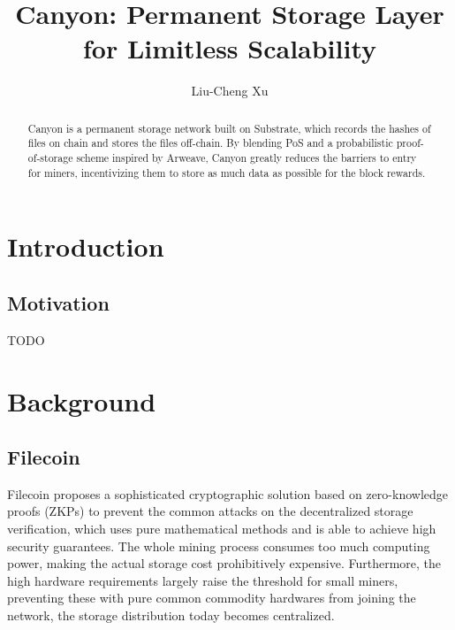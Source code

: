 \documentclass[]{article}
\title{Canyon: Permanent Storage Layer for Limitless Scalability}
\author{Liu-Cheng Xu}
\date{}
\begin{document}
\maketitle

\begin{abstract}

Canyon is a permanent storage network built on Substrate, which records the hashes of files on chain and stores the files off-chain. By blending PoS and a probabilistic proof-of-storage scheme inspired by Arweave, Canyon greatly reduces the barriers to entry for miners, incentivizing them to store as much data as possible for the block rewards.

\end{abstract}

\tableofcontents

\newpage

\section{Introduction}

\subsection{Motivation}

TODO



\section{Background}

\subsection{Filecoin}

Filecoin\cite{ref1} proposes a sophisticated cryptographic solution based on zero-knowledge proofs (ZKPs) to prevent the common attacks on the decentralized storage verification, which uses pure mathematical methods and is able to achieve high security guarantees. The whole mining process consumes too much computing power, making the actual storage cost prohibitively expensive. Furthermore, the high hardware requirements largely raise the threshold for small miners, preventing these with pure common commodity hardwares from joining the network, the storage distribution today becomes centralized.
\end{document}
